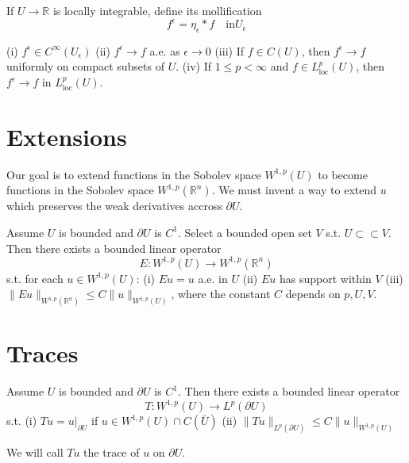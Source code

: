 \begin{definition}
    If $U\to\mathbb{R}$ is locally integrable, define its mollification 
    \[f^\epsilon=\eta_\epsilon*f\quad \text{in} U_\epsilon\]
\end{definition}

\begin{theorem}
    (i) $f^\epsilon\in C^\infty (U_\epsilon)$\newline 
    (ii) $f^\epsilon\to f$ a.e. as $\epsilon\to 0$\newline 
    (iii) If $f\in C(U)$, then $f^\epsilon\to f$ uniformly on compact subsets of $U$.\newline 
    (iv) If $1\le p<\infty$ and $f\in L^p_{\text{loc}}(U)$, then $f^\epsilon\to f$ in $L^p_{\text{loc}}(U)$.
\end{theorem}

\section{Extensions}
Our goal is to extend functions in the Sobolev space $W^{1,p}(U)$ to become functions in the Sobolev space $W^{1,p}(\mathbb{R}^n)$.
We must invent a way to extend $u$ which preserves the weak derivatives accross $\partial U$.

\begin{theorem}
    Assume $U$ is bounded and $\partial U$ is $C^1$. Select a bounded open set $V$ s.t. $U\subset \subset V$. Then there exists a bounded linear operator 
    \[ E:W^{1,p}(U)\to W^{1,p}(\mathbb{R}^n)\] 
    s.t. for each $u\in W^{1,p}(U)$:\newline 
    (i) $Eu=u$ a.e. in $U$\newline 
    (ii) $Eu$ has support within $V$\newline 
    (iii) $\|Eu\|_{W^{1,p}(\mathbb{R}^n)}\le C\|u\|_{W^{1,p}(U)}$, where the constant $C$ depends on $p,U,V$.
\end{theorem}


\section{Traces}

\begin{theorem}
    Assume $U$ is bounded and $\partial U$ is $C^1$. Then there exists a bounded linear operator 
    \[T:W^{1,p}(U)\to L^p(\partial U)\] 
    s.t. \newline 
    (i) $Tu=u|_{\partial U}$ if $u\in W^{1,p}(U)\cap C(\bar{U})$ \newline 
    (ii) $\|Tu\|_{L^p(\partial U)}\le C\|u\|_{W^{1,p}(U)}$
\end{theorem}
\begin{definition}
    We will call $Tu$ the trace of $u$ on $\partial U$.
\end{definition}

